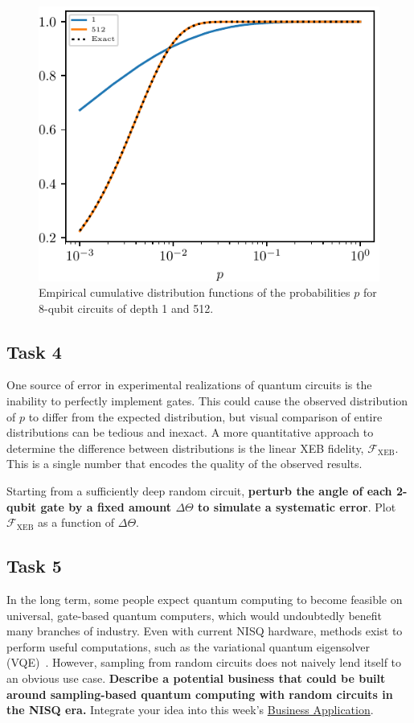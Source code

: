 \documentclass[12pt]{article}
\begin{document}
\begin{figure}
	\centering
	\includegraphics{images/dists_N=008}
	\caption{
		Empirical cumulative distribution functions of the probabilities $p$ for 8-qubit circuits of depth 1 and 512.
	}
	\label{fig:dists}
\end{figure}


\subsection*{Task 4}

One source of error in experimental realizations of quantum circuits is the inability to perfectly implement gates.
This could cause the observed distribution of $p$ to differ from the expected distribution, but visual comparison of entire distributions can be tedious and inexact.
A more quantitative approach to determine the difference between distributions is the linear XEB fidelity, $\mathcal{F}_\mathrm{XEB}$.
This is a single number that encodes the quality of the observed results.

Starting from a sufficiently deep random circuit, \textbf{perturb the angle of each 2-qubit gate by a fixed amount $\Delta \Theta$ to simulate a systematic error}.
Plot $\mathcal{F}_\mathrm{XEB}$ as a function of $\Delta \Theta$.


\subsection*{Task 5}

In the long term, some people expect quantum computing to become feasible on universal, gate-based quantum computers, which would undoubtedly benefit many branches of industry.
Even with current NISQ hardware, methods exist to perform useful computations, such as the variational quantum eigensolver (VQE)~\cite{peruzzo2014variational}.
However, sampling from random circuits does not naively lend itself to an obvious use case.
\textbf{Describe a potential business that could be built around sampling-based quantum computing with random circuits in the NISQ era.}
Integrate your idea into this week's \href{https://github.com/CDL-Quantum/CohortProject_2021/blob/main/Week1_Trapped_Ions/Business_Application.md}{Business Application}.
\end{document}
